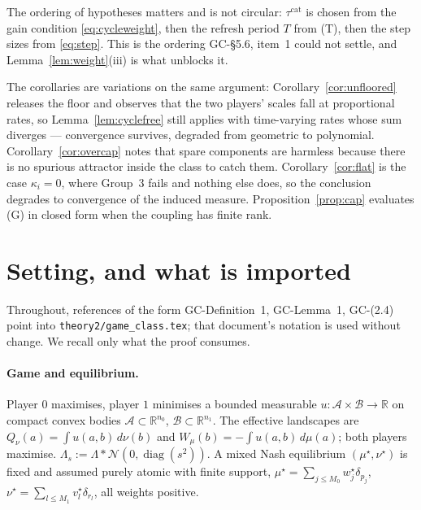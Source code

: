 \documentclass[11pt]{article}
\theoremstyle{definition}
\newcommand{\R}{\mathbb{R}}
\newcommand{\cA}{\mathcal{A}}
\newcommand{\cB}{\mathcal{B}}
\newcommand{\cN}{\mathcal{N}}
\DeclareMathOperator{\diag}{diag}
\newcommand{\GC}[1]{\textsf{GC-#1}}
\begin{document}
The ordering of hypotheses matters and is not circular: $\tau^{\mathrm{cat}}$ is
chosen from the gain condition \eqref{eq:cycleweight}, then the refresh period $T$
from (T), then the step sizes from \eqref{eq:step}. This is the ordering
\GC{\S5.6}, item~1 could not settle, and Lemma~\ref{lem:weight}(iii) is what
unblocks it.

The corollaries are variations on the same argument:
Corollary~\ref{cor:unfloored} releases the floor and observes that the two
players' scales fall at proportional rates, so Lemma~\ref{lem:cyclefree} still
applies with time-varying rates whose sum diverges --- convergence survives,
degraded from geometric to polynomial. Corollary~\ref{cor:overcap} notes that
spare components are harmless because there is no spurious attractor inside the
class to catch them. Corollary~\ref{cor:flat} is the case $\kappa_i = 0$, where
Group~3 fails and nothing else does, so the conclusion degrades to convergence of
the induced measure. Proposition~\ref{prop:cap} evaluates (G) in closed form when
the coupling has finite rank.

\section{Setting, and what is imported}\label{sec:setting}

Throughout, references of the form \GC{Definition~1}, \GC{Lemma~1},
\GC{(2.4)} point into \texttt{theory2/game\_class.tex}; that document's notation
is used without change. We recall only what the proof consumes.

\paragraph{Game and equilibrium.} Player $0$ maximises, player $1$ minimises a
bounded measurable $u : \cA \times \cB \to \R$ on compact convex bodies
$\cA \subset \R^{n_0}$, $\cB \subset \R^{n_1}$. The effective landscapes are
$Q_\nu(a) = \int u(a,b)\,d\nu(b)$ and $W_\mu(b) = -\int u(a,b)\,d\mu(a)$; both
players maximise. $\Lambda_s := \Lambda * \cN(0,\diag(s^2))$. A mixed Nash
equilibrium $(\mu^\star,\nu^\star)$ is fixed and assumed purely atomic with
finite support, $\mu^\star = \sum_{j\le M_0} w^\star_j \delta_{p_j}$,
$\nu^\star = \sum_{l\le M_1} v^\star_l \delta_{r_l}$, all weights positive.
\end{document}
